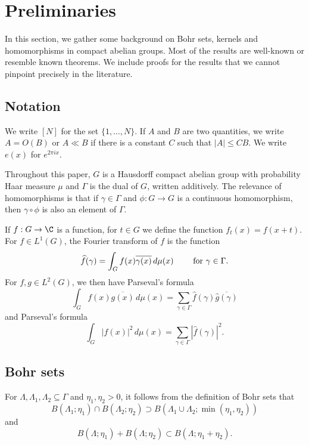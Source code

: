 \section{Preliminaries}
\label{sec:prelim}
In this section, we gather some background on Bohr sets, kernels and homomorphisms in compact abelian groups. Most of the results are well-known or resemble known theorems. We include proofs for the results that we cannot pinpoint precisely in the literature. 


\subsection{Notation} We write $[N]$ for the set $\{ 1, \ldots, N\}$. If $A$ and $B$ are two quantities, we write $A = O(B)$ or $A \ll B$ if there is a constant $C$ such that $|A| \leq CB$. We write $e(x)$ for $e^{2 \pi i x}$.

Throughout this paper, $G$ is a Hausdorff compact abelian group with probability Haar measure $\mu$ and  $\Gamma$ is the dual of $G$, written additively. The relevance of homomorphisms is that if $\gamma \in \Gamma$ and $\phi:G \rightarrow G$ is a continuous homomorphism, then $\gamma \circ \phi$ is also an element of $\Gamma$.

If $f: G \rightarrow \C$ is a function, for $t \in G$ we define the function $f_t(x) = f(x+t)$. 
For $f \in L^1(G)$, the Fourier transform of $f$ is the function
\[
\widehat{f} (\gamma) = \int_{G} f(x) \overline{\gamma (x)} \, d\mu(x) \qquad \textup{ for } \gamma \in \Gamma.
\]
For $f, g \in L^2(G)$, we then have Parseval's formula
\[
\int_{G} f(x) \overline{g(x)} \, d\mu(x) = \sum_{\gamma \in \Gamma} \widehat{f} (\gamma) \overline{ \widehat{g} (\gamma) }
\]
and Parseval's formula
\[
\int_{G} |f(x)|^2 \, d\mu(x) = \sum_{\gamma \in \Gamma} \left| \widehat{f} (\gamma) \right|^2.
\]


\subsection{Bohr sets} 
For $\Lambda, \Lambda_1, \Lambda_2 \subseteq \Gamma$ and $\eta_1, \eta_2 > 0$, it follows from the definition of Bohr sets that 
\[
    B(\Lambda_1; \eta_1) \cap B(\Lambda_2; \eta_2) \supset B(\Lambda_1 \cup \Lambda_2; \min(\eta_1, \eta_2))
\]
and
\[
    B(\Lambda; \eta_1) + B(\Lambda; \eta_2) \subset B(\Lambda; \eta_1 + \eta_2).
\]

